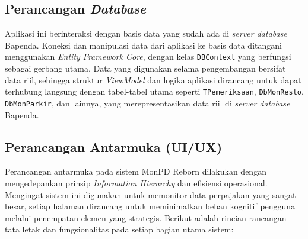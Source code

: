 \subsection{Perancangan \emph{Database}}
Aplikasi ini berinteraksi dengan basis data yang sudah ada di \emph{server database} Bapenda. Koneksi dan manipulasi data dari aplikasi ke basis data ditangani menggunakan \emph{Entity Framework Core}, dengan kelas \texttt{DBContext} yang berfungsi sebagai gerbang utama. Data yang digunakan selama pengembangan bersifat data riil, sehingga struktur \emph{ViewModel} dan logika aplikasi dirancang untuk dapat terhubung langsung dengan tabel-tabel utama seperti \texttt{TPemeriksaan}, \texttt{DbMonResto}, \texttt{DbMonParkir}, dan lainnya, yang merepresentasikan data riil di \emph{server database} Bapenda.

\subsection{Perancangan Antarmuka (UI/UX)}

Perancangan antarmuka pada sistem MonPD Reborn dilakukan dengan mengedepankan prinsip \emph{Information Hierarchy} dan efisiensi operasional. Mengingat sistem ini digunakan untuk memonitor data perpajakan yang sangat besar, setiap halaman dirancang untuk meminimalkan beban kognitif pengguna melalui penempatan elemen yang strategis. Berikut adalah rincian rancangan tata letak dan fungsionalitas pada setiap bagian utama sistem:


